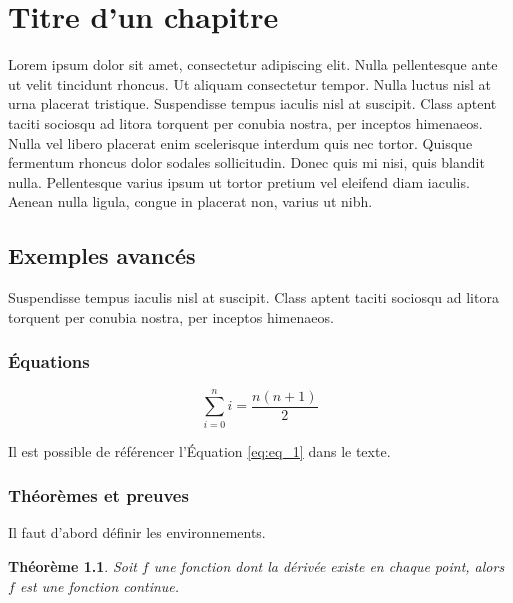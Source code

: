 \chapter{Titre d'un chapitre}\label{chap:chap_2}

Lorem ipsum dolor sit amet, consectetur adipiscing elit. Nulla pellentesque ante ut velit tincidunt rhoncus. Ut aliquam consectetur tempor. Nulla luctus nisl at urna placerat tristique. Suspendisse tempus iaculis nisl at suscipit. Class aptent taciti sociosqu ad litora torquent per conubia nostra, per inceptos himenaeos. Nulla vel libero placerat enim scelerisque interdum quis nec tortor. Quisque fermentum rhoncus dolor sodales sollicitudin. Donec quis mi nisi, quis blandit nulla. Pellentesque varius ipsum ut tortor pretium vel eleifend diam iaculis. Aenean nulla ligula, congue in placerat non, varius ut nibh.

\section{Exemples avancés}

Suspendisse tempus iaculis nisl at suscipit. Class aptent taciti sociosqu ad litora torquent per conubia nostra, per inceptos himenaeos.

\subsection{Équations}

\begin{equation}
  \label{eq:eq_1}
  \sum_{i=0}^n i = \frac{n(n+1)}{2}
\end{equation}

Il est possible de référencer l'Équation \ref{eq:eq_1} dans le texte.

\subsection{Théorèmes et preuves}

Il faut d'abord définir les environnements.

\newtheorem{theorem}{Théorème}
\newtheorem{corollary}{Corollaire}
\newtheorem{lemma}{Lemme}
\newtheorem{definition}{Definition}
\newtheorem{proof}{Preuve}

\begin{theorem}
  \label{theo:theo_1}
  Soit $f$ une fonction dont la dérivée existe en chaque point, alors $f$
  est une fonction continue.
\end{theorem}

